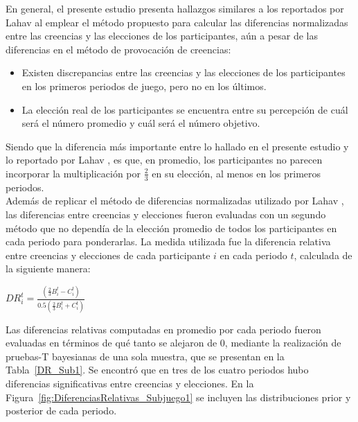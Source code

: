 En general, el presente estudio presenta hallazgos similares a los reportados por Lahav \parencite*{Lahav2015} al emplear el método propuesto para calcular las diferencias normalizadas entre las creencias y las elecciones de los participantes, aún a pesar de las diferencias en el método de provocación de creencias:\\

\begin{itemize}
\item Existen discrepancias entre las creencias y las elecciones de los participantes en los primeros periodos de juego, pero no en los últimos.\\

\item La elección real de los participantes se encuentra entre su percepción de cuál será el número promedio y cuál será el número objetivo.\\
\end{itemize}

Siendo que la diferencia más importante entre lo hallado en el presente estudio y lo reportado por Lahav \parencite*{Lahav2015},  es que, en promedio, los participantes no parecen incorporar la multiplicación por $\frac{2}{3}$ en su elección, al menos en los primeros periodos.\\

Además de replicar el método de diferencias normalizadas utilizado por Lahav \parencite*{Lahav2015}, las diferencias entre creencias y elecciones fueron evaluadas con un segundo método que no dependía de la elección promedio de todos los participantes en cada periodo para ponderarlas. La medida utilizada fue la diferencia relativa entre creencias y elecciones de cada participante $i$ en cada periodo $t$, calculada de la siguiente manera:\\

\begin{center}
$DR_i^t= \frac{(\frac{2}{3}B_i^t - C_i^t)}{0.5(\frac{2}{3}B_i^t + C_i^t)}$\\
\end{center}

Las diferencias relativas computadas en promedio por cada periodo fueron evaluadas en términos de qué tanto se alejaron de $0$, mediante la realización de pruebas-T bayesianas de una sola muestra, que se presentan en la Tabla~\ref{DR_Sub1}. Se encontró que en tres de los cuatro periodos hubo diferencias significativas entre creencias y elecciones. En la Figura~\ref{fig:DiferenciasRelativas_Subjuego1} se incluyen las distribuciones prior y posterior de cada periodo.\\

